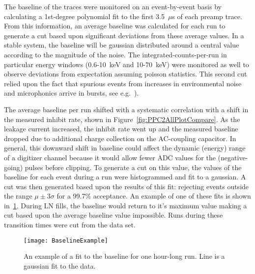 	The baseline of the traces were monitored on an event-by-event basis by calculating a 1st-degree polynomial fit to the first 3.5~$\mu$s of each preamp trace.  From this information, an average baseline was calculated for each run to generate a cut based upon significant deviations from these average values.  In a stable system, the baseline will be gaussian distributed around a central value according to the magnitude of the noise.  The integrated-counts-per-run in particular energy windows (0.6-10~keV and 10-70~keV) were monitored as well to observe deviations from expectation assuming poisson statistics.  This second cut relied upon the fact that spurious events from increases in environmental noise and microphonics arrive in bursts, see e.g.~\cite{Morales1992410}).  
	
	The average baseline per run shifted with a systematic correlation with a shift in the measured inhibit rate, shown in Figure~\ref{fig:PPC2AllPlotCompare}.  As the leakage current increased, the inhibit rate went up and the measured baseline dropped due to additional charge collection on the AC-coupling capacitor.  In general, this downward shift in baseline could affect the dynamic (energy) range of a digitizer channel because it would allow fewer ADC values for the (negative-going) pulses before clipping.  To generate a cut on this value, the values of the baseline for each event during a run were histogrammed and fit to a gaussian.  A cut was then generated based upon the results of this fit: rejecting events outside the range $\mu\pm3\sigma$ for a 99.7\% acceptance.  An example of one of these fits is shown in~\ref{fig:PPC2BaselineCuts}.  During LN fills, the baseline would return to it's maximum value making a cut based upon the average baseline value impossible.  Runs during these transition times were cut from the data set.  
		
						
				\begin{figure}
					\centering
					\texttt{[image: BaselineExample]}
					\caption{An example of a fit to the baseline for one hour-long run.  Line is a gaussian fit to the data.}
					\label{fig:PPC2BaselineCuts}
				\end{figure}

